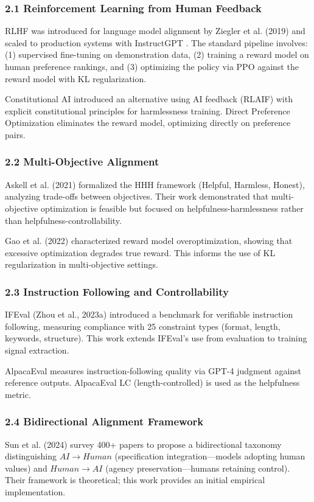 
\subsubsection{2.1 Reinforcement Learning from Human Feedback}

RLHF was introduced for language model alignment by Ziegler et al. (2019) and scaled to production systems with InstructGPT \citep{ouyang2022instructgpt}. The standard pipeline involves: (1) supervised fine-tuning on demonstration data, (2) training a reward model on human preference rankings, and (3) optimizing the policy via PPO against the reward model with KL regularization.

Constitutional AI \citep{bai2022constitutional} introduced an alternative using AI feedback (RLAIF) with explicit constitutional principles for harmlessness training. Direct Preference Optimization \citep{rafailov2023dpo} eliminates the reward model, optimizing directly on preference pairs.

\subsubsection{2.2 Multi-Objective Alignment}

Askell et al. (2021) formalized the HHH framework (Helpful, Harmless, Honest), analyzing trade-offs between objectives. Their work demonstrated that multi-objective optimization is feasible but focused on helpfulness-harmlessness rather than helpfulness-controllability.

Gao et al. (2022) characterized reward model overoptimization, showing that excessive optimization degrades true reward. This informs the use of KL regularization in multi-objective settings.

\subsubsection{2.3 Instruction Following and Controllability}

IFEval (Zhou et al., 2023a) introduced a benchmark for verifiable instruction following, measuring compliance with 25 constraint types (format, length, keywords, structure). This work extends IFEval's use from evaluation to training signal extraction.

AlpacaEval \citep{dubois2024alpacaeval} measures instruction-following quality via GPT-4 judgment against reference outputs. AlpacaEval LC (length-controlled) is used as the helpfulness metric.

\subsubsection{2.4 Bidirectional Alignment Framework}

Sun et al. (2024) survey 400+ papers to propose a bidirectional taxonomy distinguishing $AI\rightarrow Human$ (specification integration---models adopting human values) and $Human\rightarrow AI$ (agency preservation---humans retaining control). Their framework is theoretical; this work provides an initial empirical implementation.

